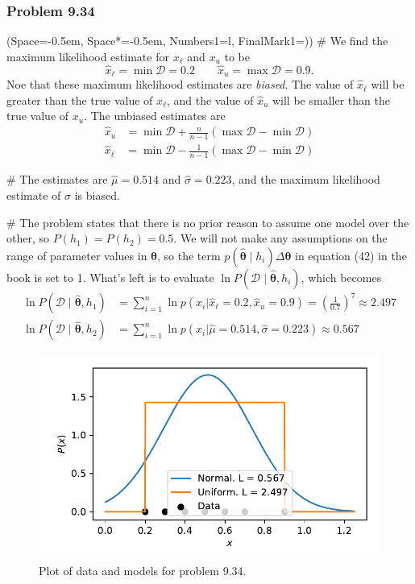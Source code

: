 \documentclass[12pt, a4paper]{article}
\newcommand{\listSpace}{-0.5em}%
\newcommand{\D}{\mathcal{D}}
\newcommand{\vect}[1]{\bm{#1}}
\begin{document}
{\subsubsection*{Problem 9.34}
\begin{easylist}[enumerate]
	\ListProperties(Space=\listSpace, Space*=\listSpace, Numbers1=l, FinalMark1={)})
	# We find the maximum likelihood estimate for $x_\ell$ and $x_u$ to be
	\begin{equation*}
		\hat{x}_\ell = \min \D = 0.2 \qquad 
		\hat{x}_u = \max \D = 0.9.
	\end{equation*}
	Noe that these maximum likelihood estimates are \emph{biased}.
	The value of $\hat{x}_\ell$ will be greater than the true value of $x_\ell$, and the value of $\hat{x}_u$ will be smaller than the true value of $x_u$.
	The unbiased estimates are
	\begin{align*}
		\hat{x}_u &= \min \D + \frac{n}{n-1} \left( \max \D - \min \D \right) \\
		\hat{x}_\ell &= \min \D - \frac{1}{n-1} \left( \max \D - \min \D \right)
	\end{align*}
	
	# The estimates are $\hat{\mu} = 0.514$ and $\hat{\sigma} = 0.223$, and the maximum likelihood estimate of $\sigma$ is biased.
	
	# The problem states that there is no prior reason to assume one model over the other, so $P(h_1) = P(h_2) = 0.5$.
	We will not make any assumptions on the range of parameter values in $\vect{\theta}$, so the term $p(\hat{\vect{\theta}} \mid h_i) \Delta \vect{\theta}$ in equation (42) in the book is set to 1.
	What's left is to evaluate $\ln P(\D \mid \hat{\vect{\theta}}, h_i)$, which becomes
	\begin{align*}
		\ln P(\D \mid \hat{\vect{\theta}}, h_1) &= 
		\sum_{i=1}^{n} \ln p(x_i | \hat{x}_\ell = 0.2, \hat{x}_u = 0.9) = \left(\frac{1}{0.7}\right)^{7} \approx 2.497 \\
		\ln P(\D \mid \hat{\vect{\theta}}, h_2) &= 
		\sum_{i=1}^{n} \ln p(x_i | \hat{\mu} = 0.514, \hat{\sigma} = 0.223) \approx 0.567
	\end{align*}
\end{easylist}
	
\begin{figure}[ht!]
\centering
\includegraphics[width=0.65\linewidth]{figs/duda_ch9_prob34}
\caption{Plot of data and models for problem 9.34.}
\label{fig:duda_ch9_prob34}
\end{figure}


}
\end{document}
